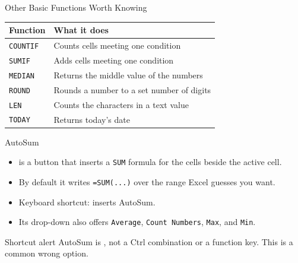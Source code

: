 \documentclass[aspectratio=169]{beamer}
\begin{document}
\begin{frame}{Other Basic Functions Worth Knowing}
  \begin{center}
    \begin{tabular}{ll}
      \toprule
      \textbf{Function} & \textbf{What it does} \\
      \midrule
      \texttt{COUNTIF} & Counts cells meeting one condition \\
      \texttt{SUMIF} & Adds cells meeting one condition \\
      \texttt{MEDIAN} & Returns the middle value of the numbers \\
      \texttt{ROUND} & Rounds a number to a set number of digits \\
      \texttt{LEN} & Counts the characters in a text value \\
      \texttt{TODAY} & Returns today's date \\
      \bottomrule
    \end{tabular}
  \end{center}
  \vspace{0.2cm}
\end{frame}

\begin{frame}{AutoSum}
  \begin{itemize}
    \item {} is a button that inserts a \texttt{SUM} formula for
      the cells beside the active cell.
    \item By default it writes \texttt{=SUM(...)} over the range Excel
      guesses you want.
    \item Keyboard shortcut:  inserts AutoSum.
    \item Its drop-down also offers \texttt{Average}, \texttt{Count Numbers},
      \texttt{Max}, and \texttt{Min}.
  \end{itemize}
  \begin{alertblock}{Shortcut alert}
    AutoSum is , not a Ctrl combination or a function key. This
    is a common wrong option.
  \end{alertblock}
\end{frame}
\end{document}
